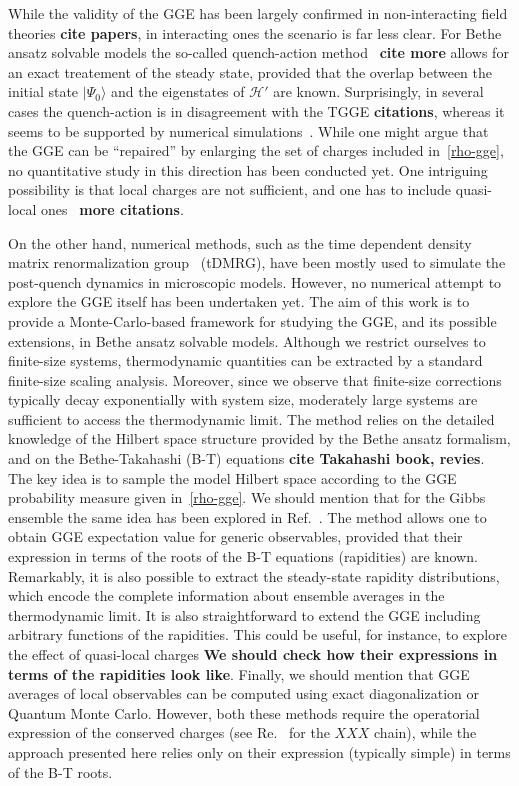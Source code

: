 \documentclass[twocolumn,superscriptaddress,prb,10pt]{revtex4-1}
\begin{document}
While the validity of the GGE 
has been largely confirmed in non-interacting field theories {\bf cite papers}, 
in interacting ones the scenario is far less clear. For Bethe ansatz solvable models 
the so-called quench-action method~\cite{caux-2013} {\bf cite more} allows for an 
exact treatement of the steady state, provided that the overlap between the initial 
state $|\Psi_0\rangle$ and the eigenstates of ${\mathcal H}'$ are known. Surprisingly, 
in several cases the quench-action is in disagreement with the TGGE {\bf citations}, 
whereas it seems to be supported by numerical simulations~\cite{pozsgay-2014}. 
While one might argue that the GGE can be ``repaired'' by enlarging the set of 
charges included in~\eqref{rho-gge}, 
no quantitative study in this direction has been conducted yet. One intriguing 
possibility is that local charges are not sufficient, and one has to include 
quasi-local ones~\cite{ilievski-2015} {\bf more citations}. 

On the other hand, numerical methods, such as the time dependent density 
matrix renormalization group~\cite{white-2004,daley-2004} (tDMRG), have been mostly 
used to simulate the post-quench dynamics in microscopic models. However, no numerical 
attempt to explore the GGE itself has been undertaken yet. The aim of this work is to 
provide a Monte-Carlo-based framework for studying  the GGE, and its possible extensions,   
in Bethe ansatz solvable models. Although we restrict ourselves to finite-size systems, 
thermodynamic quantities can be extracted by a standard finite-size scaling analysis. 
Moreover, since we observe that finite-size corrections typically decay exponentially with 
system size, moderately large systems are sufficient to access the thermodynamic limit. 
The method relies on the detailed knowledge of the Hilbert space structure provided by 
the Bethe ansatz formalism, and on the Bethe-Takahashi (B-T) equations {\bf cite 
Takahashi book, revies}. The key idea is to sample the model Hilbert space according to 
the GGE probability measure given in~\eqref{rho-gge}. We should mention that for the 
Gibbs ensemble the same idea has been explored in Ref.~.
The method allows one to obtain GGE expectation value for generic observables, provided 
that their expression in terms of the roots of 
the B-T equations (rapidities) are known. Remarkably, it is also possible to extract 
the steady-state rapidity distributions, which encode the complete information about  
ensemble averages in the thermodynamic limit. It is also straightforward to extend  
the GGE including arbitrary functions of the rapidities. This could be useful, for 
instance, to explore the effect of quasi-local charges {\bf We should check how their 
expressions in terms of the rapidities look like}.   
Finally, we should mention that GGE averages of local observables can be computed 
using exact diagonalization or Quantum Monte Carlo. However, both these methods require 
the operatorial expression of the conserved charges (see Re.~ 
for the $XXX$ chain), while the approach presented here 
relies only on their expression (typically simple) in terms of the B-T roots. 
\end{document}
